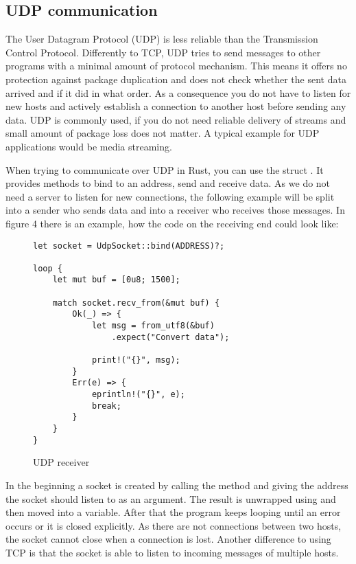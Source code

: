 \subsection{UDP communication}
The User Datagram Protocol (UDP) is less reliable than the Transmission Control Protocol. Differently to TCP, UDP tries
to send messages to other programs with a minimal amount of protocol mechanism. This means it offers no protection
against package duplication and does not check whether the sent data arrived and if it did in what order. As a
consequence you do not have to listen for new hosts and actively establish a connection to another host before sending
any data. UDP is commonly used, if you do not need reliable delivery of streams and small amount of package loss does
not matter. A typical example for UDP applications would be media streaming. \cite{RFC0768}

When trying to communicate over UDP in Rust, you can use the struct . It provides methods to
bind to an address, send and receive data. As we do not need a server to listen for new connections, the following
example will be split into a sender who sends data and into a receiver who receives those messages. In figure 4 there
is an example, how the code on the receiving end could look like:

\begin{figure}[ht]
    \begin{verbatim}
let socket = UdpSocket::bind(ADDRESS)?;

loop {
    let mut buf = [0u8; 1500];

    match socket.recv_from(&mut buf) {
        Ok(_) => {
            let msg = from_utf8(&buf)
                .expect("Convert data");

            print!("{}", msg);
        }
        Err(e) => {
            eprintln!("{}", e);
            break;
        }
    }
}
    \end{verbatim}
    \caption{UDP receiver}
\end{figure}

In the beginning a socket is created by calling the  method and giving the address the socket should listen
to as an argument. The result is unwrapped using  and then moved into a variable. After that the program keeps
looping until an error occurs or it is closed explicitly. As there are not connections between two hosts, the socket
cannot close when a connection is lost. Another difference to using TCP is that the socket is able to listen to
incoming messages of multiple hosts.

